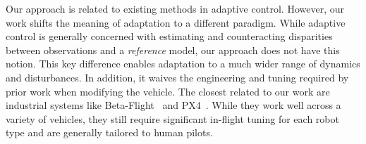Our approach is related to existing methods in adaptive control.
%
However, our work shifts the meaning of adaptation to a different paradigm.
%
While adaptive control is generally concerned with estimating and counteracting disparities between observations and a \emph{reference} model, our approach does not have this notion. %
%
This key difference enables adaptation to a much wider range of dynamics and disturbances.
%
In addition, it waives the engineering and tuning required by prior work when modifying the vehicle.
%
%
The closest related to our work are industrial systems like Beta-Flight~\cite{BetaFlight} and PX4~\cite{PX4}.
%
While they work well across a variety of vehicles, they still require significant in-flight tuning for each robot type and are generally tailored to human pilots.
%
